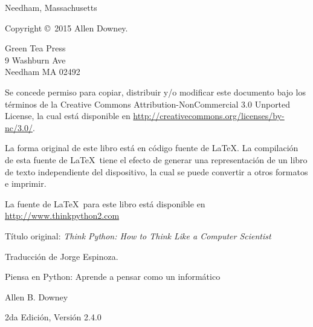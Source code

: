 \documentclass[10pt]{book}
\newcommand{\thetitle}{Piensa en Python: Aprende a pensar como un informático}
\newcommand{\theversion}{2da Edición, Versión 2.4.0}
\newcommand{\thedate}{}
\begin{document}
\begin{latexonly}
\begin{flushright}
{\small Needham, Massachusetts}

\vfill

\end{flushright}


\pagebreak
\thispagestyle{empty}

{\small
Copyright \copyright ~2015 Allen Downey.


\vspace{0.2in}

\begin{flushleft}
Green Tea Press       \\
9 Washburn Ave        \\
Needham MA 02492
\end{flushleft}

Se concede permiso para copiar, distribuir y/o modificar este documento
bajo los términos de la Creative Commons Attribution-NonCommercial
3.0 Unported License, la cual está disponible en \url{http://creativecommons.org/licenses/by-nc/3.0/}.

La forma original de este libro está en código fuente de \LaTeX.  La compilación
de esta fuente de \LaTeX\ tiene el efecto de generar una representación de un libro
de texto independiente del dispositivo, la cual se puede convertir a otros formatos
e imprimir.

La fuente de \LaTeX\ para este libro está disponible en
\url{http://www.thinkpython2.com}

Título original: {\em Think Python: How to Think Like a Computer Scientist}

Traducción de Jorge Espinoza.

\vspace{0.2in}

} %

\end{latexonly}



\begin{htmlonly}


{\Large \thetitle}

{\large Allen B. Downey}

\theversion

\thedate

\setcounter{chapter}{-1}

\end{htmlonly}
\end{document}

